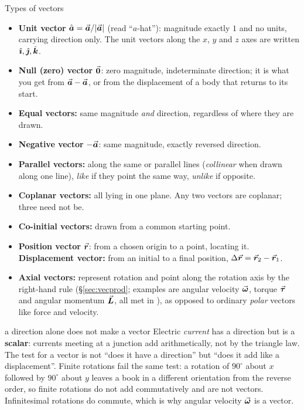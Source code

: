 \begin{defbox}{Types of vectors}
\begin{itemize}
\item \textbf{Unit vector} $\hat{\bm{a}}=\vec{\bm{a}}/|\vec{\bm{a}}|$ (read ``$a$-hat''): magnitude exactly $1$ and no
      units, carrying direction only. The unit vectors along the $x$, $y$ and $z$ axes are written
      $\hat{\bm{\imath}},\hat{\bm{\jmath}},\hat{\bm{k}}$.
\item \textbf{Null (zero) vector} $\vec{\bm{0}}$: zero magnitude, indeterminate direction; it is what you get from
      $\vec{\bm{a}}-\vec{\bm{a}}$, or from the displacement of a body that returns to its start.
\item \textbf{Equal vectors:} same magnitude \emph{and} direction, regardless of where they are drawn.
\item \textbf{Negative vector} $-\vec{\bm{a}}$: same magnitude, exactly reversed direction.
\item \textbf{Parallel vectors:} along the same or parallel lines (\emph{collinear} when drawn along
      one line), \emph{like} if they
      point the same way, \emph{unlike} if opposite.
\item \textbf{Coplanar vectors:} all lying in one plane. Any two vectors are coplanar; three need
      not be.
\item \textbf{Co-initial vectors:} drawn from a common starting point.
\item \textbf{Position vector} $\vec{\bm{r}}$: from a chosen origin to a point, locating it.
      \textbf{Displacement vector:} from an initial to a final position, $\Delta\vec{\bm{r}}=\vec{\bm{r}}_2-\vec{\bm{r}}_1$.
\item \textbf{Axial vectors:} represent rotation and point along the rotation axis by the right-hand
      rule (\S\ref{sec:vecprod}; examples are angular velocity $\vec{\bm{\omega}}$, torque $\vec{\bm{\tau}}$ and angular momentum $\vec{\bm{L}}$, all met in
      ), as opposed to ordinary \emph{polar} vectors like force and
      velocity.
\end{itemize}
\end{defbox}

\begin{figure}[htbp]
\centering
{}
\end{figure}

\begin{trapbox}{a direction alone does not make a vector}
Electric \emph{current} has a direction but is a \textbf{scalar}: currents meeting at a junction add
arithmetically, not by the triangle law. The test for a vector is not ``does it have a direction'' but
``does it add like a displacement''. Finite rotations fail the same test: a rotation of $90^\circ$
about $x$ followed by $90^\circ$ about $y$ leaves a book in a different orientation from the reverse
order, so finite rotations do not add commutatively and are not vectors. Infinitesimal rotations do
commute, which is why angular velocity $\vec{\bm{\omega}}$ is a vector.
\end{trapbox}

